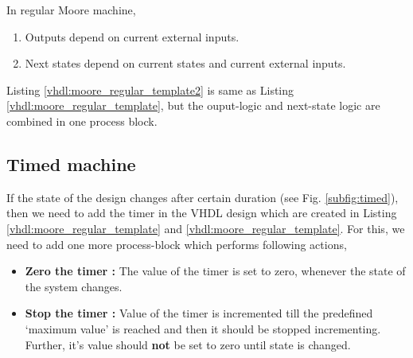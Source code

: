 \begin{noNumBox}
	In regular Moore machine, 
	\begin{enumerate}
		\item Outputs depend on current external inputs. 
		\item Next states depend on current states and current external inputs.
	\end{enumerate}
\end{noNumBox}



Listing \ref{vhdl:moore_regular_template2} is same as Listing \ref{vhdl:moore_regular_template}, but the ouput-logic and next-state logic are combined in one process block. 



\subsection{Timed machine}
If the state of the design changes after certain duration (see Fig. \ref{subfig:timed}), then we need to add the timer in the VHDL design which are created in Listing \ref{vhdl:moore_regular_template} and \ref{vhdl:moore_regular_template}. For this, we need to add one more process-block which performs following actions, 
\begin{itemize}
	\item \textbf{Zero the timer : } The value of the timer is set to zero, whenever the state of the system changes. 
	\item \textbf{Stop the timer : } Value of the timer is incremented till the predefined `maximum value' is reached and then it should be stopped incrementing. Further, it's value should \textbf{not} be set to zero until state is changed. 
\end{itemize}

